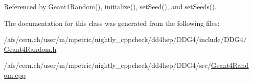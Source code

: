 Referenced by Geant4\+Random(), initialize(), set\+Seed(), and set\+Seeds().



The documentation for this class was generated from the following files\+:\begin{DoxyCompactItemize}
\item 
/afs/cern.\+ch/user/m/mpetric/nightly\+\_\+cppcheck/dd4hep/\+D\+D\+G4/include/\+D\+D\+G4/\hyperlink{_geant4_random_8h}{Geant4\+Random.\+h}\item 
/afs/cern.\+ch/user/m/mpetric/nightly\+\_\+cppcheck/dd4hep/\+D\+D\+G4/src/\hyperlink{_geant4_random_8cpp}{Geant4\+Random.\+cpp}\end{DoxyCompactItemize}
